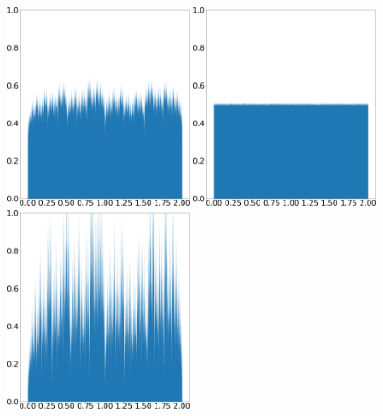 \begin{figure}[H]
    \centering
    \includegraphics[width=0.48\textwidth]{figure/tent_wave_shadow_density_0.05.png}
    \hspace{0.02\textwidth}
    \includegraphics[width=0.48\textwidth]{figure/tent_wave_physical_density_0.05.png}
    \\ \vspace{0.02\textwidth}
    \includegraphics[width=0.48\textwidth]{figure/tent_wave_shadow_density_0.2.png}
    \hspace{0.02\textwidth}

\end{figure}
